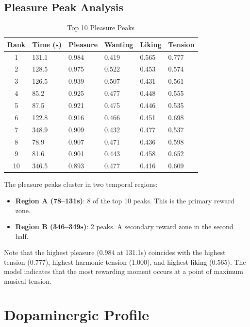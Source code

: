 \documentclass[11pt]{article}
\begin{document}
\subsection{Pleasure Peak Analysis}

\begin{table}[H]
\centering
\caption{Top 10 Pleasure Peaks}
\label{tab:peaks}
\small
\begin{tabular}{c R{1.4cm} R{1.4cm} R{1.4cm} R{1.4cm} R{1.4cm}}
\toprule
\textbf{Rank} & \textbf{Time (s)} & \textbf{Pleasure} & \textbf{Wanting} & \textbf{Liking} & \textbf{Tension} \\
 & 131.1 & 0.984 & 0.419 & 0.565 & 0.777 \\
2 & 128.5 & 0.975 & 0.522 & 0.453 & 0.574 \\
3 & 126.5 & 0.939 & 0.507 & 0.431 & 0.561 \\
4 & 85.2 & 0.925 & 0.477 & 0.448 & 0.555 \\
5 & 87.5 & 0.921 & 0.475 & 0.446 & 0.535 \\
6 & 122.8 & 0.916 & 0.466 & 0.451 & 0.698 \\
7 & 348.9 & 0.909 & 0.432 & 0.477 & 0.537 \\
8 & 78.9 & 0.907 & 0.471 & 0.436 & 0.598 \\
9 & 81.6 & 0.901 & 0.443 & 0.458 & 0.652 \\
10 & 346.5 & 0.893 & 0.477 & 0.416 & 0.609 \\
\bottomrule
\end{tabular}
\end{table}

The pleasure peaks cluster in two temporal regions:
\begin{itemize}
    \item \textbf{Region A (78--131s)}: 8 of the top 10 peaks. This is the primary reward zone.
    \item \textbf{Region B (346--349s)}: 2 peaks. A secondary reward zone in the second half.
\end{itemize}

Note that the highest pleasure (0.984 at 131.1s) coincides with the highest tension (0.777), highest harmonic tension (1.000), and highest liking (0.565). The model indicates that the most rewarding moment occurs at a point of maximum musical tension.

\section{Dopaminergic Profile}
\end{document}
